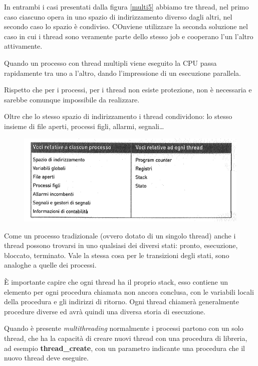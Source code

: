 In entrambi i casi presentati dalla figura \ref{multi5} abbiamo tre thread, nel primo caso ciascuno opera in uno spazio di indirizzamento diverso dagli altri, nel secondo caso lo spazio è condiviso. COnviene utilizzare la seconda soluzione nel caso in cui i thread sono veramente parte dello stesso job e cooperano l'un l'altro attivamente.

Quando un processo con thread multipli viene eseguito la CPU passa rapidamente tra uno a l'altro, dando l'impressione di un esecuzione parallela.

Rispetto che per i processi, per i thread non esiste protezione, non è necessaria e sarebbe comunque impossibile da realizzare.

Oltre che lo stesso spazio di indirizzamento i thread condividono: lo stesso insieme di file aperti, processi figli, allarmi, segnali\dots

\begin{figure}[H]
    \centering
    \includegraphics[width=0.9\linewidth]{assets/risorse5.png}
    \caption{ }
\end{figure}


Come un processo tradizionale (ovvero dotato di un singolo thread) anche i thread possono trovarsi in uno qualsiasi dei diversi stati: pronto, esecuzione, bloccato, terminato. Vale la stessa cosa per le transizioni degli stati, sono analoghe a quelle dei processi.

È importante capire che ogni thread ha il proprio stack, esso contiene un elemento per ogni procedura chiamata non ancora conclusa, con le variabili locali della procedura e gli indirizzi di ritorno. Ogni thread chiamerà generalmente procedure diverse ed avrà quindi una diversa storia di esecuzione.

Quando è presente \textit{multithreading} normalmente i processi partono con un solo thread, che ha la capacità di creare nuovi thread con una procedura di libreria, ad esempio \textbf{thread\_create}, con un parametro indicante una procedura che il nuovo thread deve eseguire.

